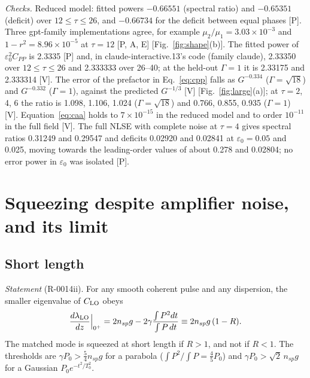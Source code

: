 \documentclass[aps,pra,twocolumn,superscriptaddress,nofootinbib,floatfix]{revtex4-2}
\newcommand{\nsp}{n_{sp}}
\newcommand{\eps}{\varepsilon_0}
\newcommand{\lamLO}{\lambda_{\rm LO}}
\newcommand{\rk}[1]{[\textsf{#1}]}
\begin{document}
\textit{Checks.} Reduced model: fitted powers $-0.66551$ (spectral ratio) and $-0.65351$ (deficit) over $12\le\tau\le26$,
and $-0.66734$ for the deficit between equal phases \rk{P}. Three gpt-family implementations agree, for example
$\mu_2/\mu_1=3.03\times10^{-3}$ and $1-r^2=8.96\times10^{-5}$ at $\tau=12$ \rk{P, A, E} [Fig.~\ref{fig:shape}(b)]. The fitted
power of $\eps^2C_{PP}$ is 2.3335 \rk{P} and, in claude-interactive.13's code (family claude), 2.33350 over $12\le\tau\le26$
and 2.333333 over 26--40; at the held-out $\Gamma=1$ it is 2.33175 and 2.333314 \rk{V}. The error of the prefactor in
Eq.~\eqref{eq:cpp} falls as $G^{-0.334}$ ($\Gamma=\sqrt{18}$) and $G^{-0.332}$ ($\Gamma=1$), against the predicted $G^{-1/3}$
\rk{V} [Fig.~\ref{fig:large}(a)]; at $\tau=2$, 4, 6 the ratio is 1.098, 1.106, 1.024 ($\Gamma=\sqrt{18}$) and 0.766, 0.855,
0.935 ($\Gamma=1$) \rk{V}. Equation~\eqref{eq:caa} holds to $7\times10^{-15}$ in
the reduced model and to order $10^{-11}$ in the full field \rk{V}. The full NLSE with complete noise at $\tau=4$ gives spectral
ratios 0.31249 and 0.29547 and deficits 0.02920 and 0.02841 at $\eps=0.05$ and 0.025, moving towards the leading-order
values of about 0.278 and 0.02804; no error power in $\eps$ was isolated \rk{P}.

\section{Squeezing despite amplifier noise, and its limit}\label{sec:sq}

\subsection{Short length}

\textit{Statement} (R-0014ii). For any smooth coherent pulse and any dispersion, the smaller eigenvalue of $C_{\rm LO}$
obeys
\begin{equation}
\frac{d\lamLO}{dz}\Big|_{0^+}=2\nsp g-2\gamma\frac{\int P^2dt}{\int P\,dt}\equiv2\nsp g\,(1-R).\label{eq:slope}
\end{equation}
The matched mode is squeezed at short length if $R>1$, and not if $R<1$. The thresholds are $\gamma P_0>\frac54\nsp g$
for a parabola ($\int P^2/\!\int P=\frac45P_0$) and $\gamma P_0>\sqrt2\,\nsp g$ for a Gaussian $P_0e^{-t^2/T_0^2}$.
\end{document}
